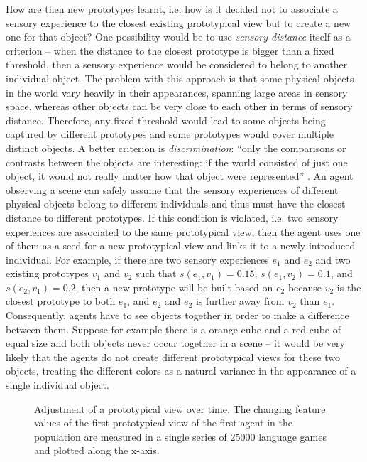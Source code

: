 How are then new prototypes learnt, i.e. how is it decided not to
associate a sensory experience to the closest existing prototypical
view but to create a new one for that object? One possibility would be
to use \emph{sensory distance} itself as a criterion -- when the
distance to the closest prototype is bigger than a fixed threshold,
then a sensory experience would be considered to belong to another
individual object. The problem with this approach is that some
physical objects in the world vary heavily in their appearances,
spanning large areas in sensory space, whereas other objects can be
very close to each other in terms of sensory distance. Therefore, any
fixed threshold would lead to some objects being captured by different
prototypes and some prototypes would cover multiple distinct
objects. A better criterion is \emph{discrimination}: ``only the
comparisons or contrasts between the objects are interesting: if the
world consisted of just one object, it would not really matter how
that object were represented''
\citep[p. 51]{edelman95representation}. An agent observing a scene can
safely assume that the sensory experiences of different physical
objects belong to different individuals and thus must have the closest
distance to different prototypes. If this condition is violated,
i.e. two sensory experiences are associated to the same prototypical
view, then the agent uses one of them as a seed for a new prototypical
view and links it to a newly introduced individual. For example, if
there are two sensory experiences $e_1$ and $e_2$ and two existing
prototypes $v_1$ and $v_2$ such that $s(e_1,v_1) = 0.15$, $s(e_1,v_2)
= 0.1$, and $s(e_2,v_1) = 0.2$, then a new prototype will be built
based on $e_2$ because $v_2$ is the closest prototype to both $e_1$,
and $e_2$ and $e_2$ is further away from $v_2$ than
$e_1$. Consequently, agents have to see objects together in order to
make a difference between them. Suppose for example there is a orange
cube and a red cube of equal size and both objects never occur
together in a scene -- it would be very likely that the agents do not
create different prototypical views for these two objects, treating
the different colors as a natural variance in the appearance of a
single individual object.

\begin{figure}[t]
  \caption{Adjustment of a prototypical view over time. The changing
    feature values of the first prototypical view of the first agent
    in the population are measured in a single series of 25000
    language games and plotted along the x-axis.}
  \label{f:gng-evolution-of-prototype-mean-values}
\end{figure}

